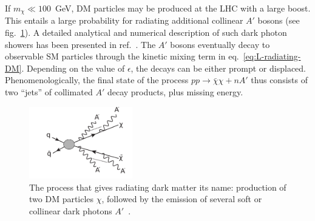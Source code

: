 If $m_\chi \ll 100$~GeV, DM particles may be produced at the LHC with a large
boost.  This entails a large probability for radiating additional collinear
$A'$ bosons (see fig.~\ref{fig:radiating-dm-diagram}).  A detailed analytical
and numerical description of such dark photon showers has been presented in
ref.~\cite{Buschmann:2015awa}. The $A'$ bosons eventually decay to
observable SM particles through the kinetic mixing term in
eq.~\eqref{eq:L-radiating-DM}.
Depending on the value of $\epsilon$, the decays can be either prompt or
displaced. Phenomenologically, the final state of the process $p p \to \bar\chi
\chi + n A'$ thus consists of two ``jets'' of collimated $A'$ decay products,
plus missing energy.

\begin{figure}[b]
  \begin{center}
    \includegraphics[width=0.4\textwidth]{figures/DS_darkradiation.pdf}
  \end{center}
  \vspace{-0.7cm}
  \caption{The process that gives radiating dark matter its name: production of
    two DM particles $\chi$, followed by the emission of several soft or collinear
    dark photons $A'$~\cite{Buschmann:2015awa}.}
  \label{fig:radiating-dm-diagram}
\end{figure}

